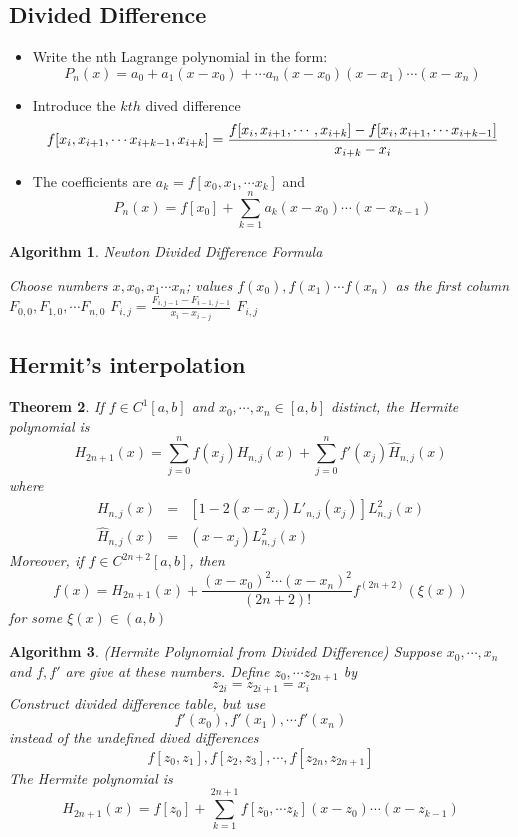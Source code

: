 \documentclass[12pt]{article}
\newtheorem{theorem}{Theorem}[subsection]
\newtheorem{alg}[theorem]{Algorithm}
\begin{document}
\subsection{Divided Difference}
\begin{itemize}
	\item Write the nth Lagrange polynomial in the form: 
	$$P_n(x) = a_0 +a_1(x - x_0) +\cdots a_n(x - x_0)(x - x_1) \cdots (x-x_n)$$
	\item Introduce the $kth$ dived difference
	$$
		f[x_i, x_{i+1}, \cdots x_{i+k-1}, x_{i+k}]  =  \\
		\frac{f[x_i, x_{i+1}, \cdots, x_{i+k}] - f[x_i, x_{i+1}, \cdots x_{i+k-1}]}{x_{i+k} - x_i}
	$$
	\item The coefficients are $a_k = f[x_0,x_1, \cdots x_k]$ and 
	$$P_n(x) = f[x_0] + \sum_{k=1}^{n}a_k(x - x_0) \cdots (x - x_{k-1})$$
\end{itemize}
\begin{alg}{Newton Divided Difference Formula}
\begin{algorithmic}
Choose numbers $x,x_0,x_1 \cdots x_n$; values $f(x_0), f(x_1) \cdots f(x_n)$ as the first column $F_{0,0}, F_{1,0}, \cdots F_{n,0}$ 
\State $F_{i,j} = \frac{F_{i,j-1} -F_{i-1,j-1}}{x_i - x_{i-j}}$
\EndFor
\EndFor
\State \Return $F_{i,j}$
\end{algorithmic}


\end{alg}

\subsection{Hermit's interpolation}
\begin{theorem}
	If $f \in C^1[a,b]$ and $x_0, \cdots, x_n \in [a,b]$ distinct, the Hermite polynomial is 
	$$H_{2n+1}(x) = \sum_{j=0}^n f(x_j)H_{n,j}(x) + \sum_{j=0}^n f'(x_j)\hat{H}_{n,j}(x)$$
	where 
	\begin{eqnarray*}		
	H_{n,j}(x) &=& [1 - 2(x - x_j)L'_{n,j}(x_j)]L^2_{n,j}(x) \\
	\hat{H}_{n,j}(x) &=& (x - x_j)L^2_{n,j}(x)
	\end{eqnarray*}
	Moreover, if $f \in C^{2n+2}[a,b]$, then 
	$$f(x) = H_{2n+1}(x) + \frac{(x - x_0)^2 \cdots (x - x_n)^2}{(2n+2)!}f^{(2n+2)}(\xi(x))$$
	for some $\xi(x) \in (a,b)$
\end{theorem}
\begin{alg}{(Hermite Polynomial from Divided Difference)}
\newline Suppose $x_0, \cdots, x_n$and $f,f'$ are give at these numbers. Define $z_0, \cdots z_{2n+1}$ by 
$$z_{2i} = z_{2i+1} = x_i$$
Construct divided difference table, but use 
$$f'(x_0), f'(x_1), \cdots f'(x_n)$$
instead of the undefined dived differences 
$$f[z_0,z_1], f[z_2,z_3], \cdots, f[z_{2n},z_{2n+1}]$$
The Hermite polynomial is 
$$H_{2n+1}(x) = f[z_0] +\sum_{k=1}^{2n+1}f[z_0, \cdots z_k](x - z_0) \cdots (x - z_{k-1})$$	
\end{alg}
\end{document}
